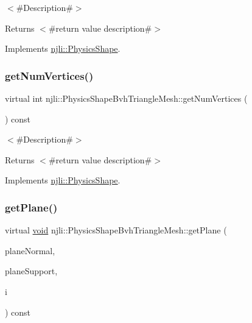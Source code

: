 $<$\#\+Description\#$>$

\begin{DoxyReturn}{Returns}
$<$\#return value description\#$>$ 
\end{DoxyReturn}


Implements \mbox{\hyperlink{classnjli_1_1_physics_shape_a11cb80220393bfce177b8bdc34f7f359}{njli\+::\+Physics\+Shape}}.

\mbox{\label{classnjli_1_1_physics_shape_bvh_triangle_mesh_af0263ac5341f2a8e560142a02aba7f34}} 
\subsubsection{\texorpdfstring{get\+Num\+Vertices()}{getNumVertices()}}
{\footnotesize\ttfamily virtual int njli\+::\+Physics\+Shape\+Bvh\+Triangle\+Mesh\+::get\+Num\+Vertices (\begin{DoxyParamCaption}{ }\end{DoxyParamCaption}) const\hspace{0.3cm}{\ttfamily [virtual]}}

$<$\#\+Description\#$>$

\begin{DoxyReturn}{Returns}
$<$\#return value description\#$>$ 
\end{DoxyReturn}


Implements \mbox{\hyperlink{classnjli_1_1_physics_shape_ac3f7cc28341fd58ace164bf8666480f0}{njli\+::\+Physics\+Shape}}.

\mbox{\label{classnjli_1_1_physics_shape_bvh_triangle_mesh_ab45fe98147c8ee9fa8a576ad8b1fb472}} 
\subsubsection{\texorpdfstring{get\+Plane()}{getPlane()}}
{\footnotesize\ttfamily virtual \mbox{\hyperlink{_thread_8h_af1e856da2e658414cb2456cb6f7ebc66}{void}} njli\+::\+Physics\+Shape\+Bvh\+Triangle\+Mesh\+::get\+Plane (\begin{DoxyParamCaption}\item[{bt\+Vector3 \&}]{plane\+Normal,  }\item[{bt\+Vector3 \&}]{plane\+Support,  }\item[{int}]{i }\end{DoxyParamCaption}) const\hspace{0.3cm}{\ttfamily [virtual]}}

